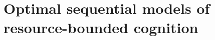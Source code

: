 



\section{Optimal sequential models of resource-bounded cognition}\label{sec:intro-final}



\newcommand{\hl}[2]{%
  {\color{#1!90!black} #2}
}


